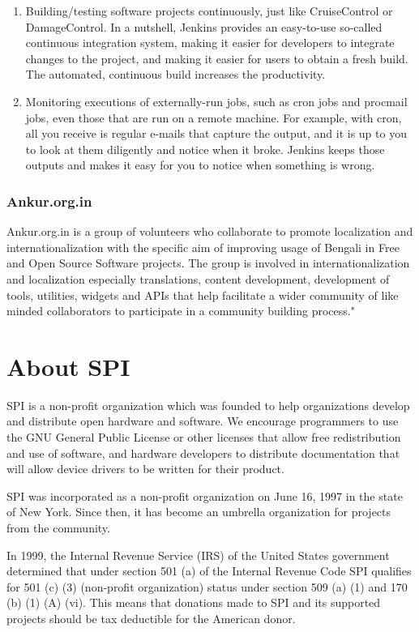 \documentclass[letterpaper]{report}
\begin{document}
\begin{enumerate}
\item Building/testing software projects continuously, just like CruiseControl
or DamageControl. In a nutshell, Jenkins provides an easy-to-use so-called
continuous integration system, making it easier for developers to integrate
changes to the project, and making it easier for users to obtain a fresh build.
The automated, continuous build increases the productivity.

\item Monitoring executions of externally-run jobs, such as cron jobs and
procmail jobs, even those that are run on a remote machine. For example, with
cron, all you receive is regular e-mails that capture the output, and it is up
to you to look at them diligently and notice when it broke. Jenkins keeps those
outputs and makes it easy for you to notice when something is wrong.
\end{enumerate}

\subsection{Ankur.org.in}
Ankur.org.in is a group of volunteers who collaborate to promote localization
and internationalization with the specific aim of improving usage of Bengali in
Free and Open Source Software projects. The group is involved in
internationalization and localization especially translations, content
development, development of tools, utilities, widgets and APIs that help
facilitate a wider community of like minded collaborators to participate in a
community building process."

\appendix
\chapter{About SPI}

SPI is a non-profit organization which was founded to help organizations
develop and distribute open hardware and software. We encourage programmers
to use the GNU General Public License or other licenses that allow free
redistribution and use of software, and hardware developers to distribute
documentation that will allow device drivers to be written for their product.

SPI was incorporated as a non-profit organization on June 16, 1997 in the state
of New York. Since then, it has become an umbrella organization for projects
from the community.

In 1999, the Internal Revenue Service (IRS) of the United States government
determined that under section 501 (a) of the Internal Revenue Code SPI
qualifies for 501 (c) (3) (non-profit organization) status under section 509
(a) (1) and 170 (b) (1) (A) (vi). This means that donations made to SPI and its
supported projects should be tax deductible for the American donor.
\end{document}
